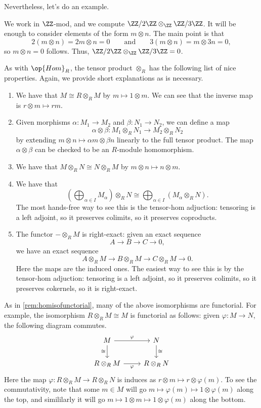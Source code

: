 Nevertheless, let's do an example.
\begin{example}
	We work in $\ZZ$-mod, and we compute $\ZZ/2\ZZ\otimes_\ZZ\ZZ/3\ZZ$. It will be enough to consider elements of the form $m\otimes n$. The main point is that
	\[2(m\otimes n)=2m\otimes n=0\qquad\text{and}\qquad3(m\otimes n)=m\otimes3n=0,\]
	so $m\otimes n=0$ follows. Thus, $\ZZ/2\ZZ\otimes_\ZZ\ZZ/3\ZZ=0$.
\end{example}
As with $\op{Hom}_R$, the tensor product $\otimes_R$ has the following list of nice properties. Again, we provide short explanations as is necessary.
\begin{enumerate}
	\item We have that $M\cong R\otimes_RM$ by $m\mapsto1\otimes m$. We can see that the inverse map is $r\otimes m\mapsto rm$.
	\item Given morphisms $\alpha:M_1\to M_2$ and $\beta:N_1\to N_2$, we can define a map
	\[\alpha\otimes\beta:M_1\otimes_R N_1\to M_2\otimes_R N_2\]
	by extending $m\otimes n\mapsto\alpha m\otimes\beta n$ linearly to the full tensor product. The map $\alpha\otimes\beta$ can be checked to be an $R$-module homomorphism.
	\item We have that $M\otimes_R N\cong N\otimes_R M$ by $m\otimes n\mapsto n\otimes m$.
	\item We have that
	\[\left(\bigoplus_{\alpha\in I}M_\alpha\right)\otimes_RN\cong\bigoplus_{\alpha\in I}(M_\alpha\otimes_R N).\]
	The most hands-free way to see this is the tensor-hom adjuction: tensoring is a left adjoint, so it preserves colimits, so it preserves coproducts.
	\item The functor $-\otimes_RM$ is right-exact: given an exact sequence
	\[A\to B\to C\to 0,\]
	we have an exact sequence
	\[A\otimes_RM\to B\otimes_RM\to C\otimes_RM\to 0.\]
	Here the maps are the induced ones. The easiest way to see this is by the tensor-hom adjuction: tensoring is a left adjoint, so it preserves colimits, so it preserves cokernels, so it is right-exact.
\end{enumerate}
\begin{remark}[Nir] \label{rem:tensorisofunctorial}
	As in \autoref{rem:homisofunctorial}, many of the above isomorphisms are functorial. For example, the isomorphism $R\otimes_RM\cong M$ is functorial as follows: given $\varphi:M\to N$, the following diagram commutes.
	\[\begin{tikzcd}
		M & N \\
		{R\otimes_RM} & {R\otimes_RN}
		\arrow["\cong"', from=1-1, to=2-1]
		\arrow["\cong", from=1-2, to=2-2]
		\arrow["\varphi", from=1-1, to=1-2]
		\arrow["\varphi"', from=2-1, to=2-2]
	\end{tikzcd}\]
	Here the map $\varphi:R\otimes_RM\to R\otimes_RN$ is induces as $r\otimes m\mapsto r\otimes\varphi(m)$. To see the commutativity, note that some $m\in M$ will go $m\mapsto\varphi(m)\mapsto1\otimes\varphi(m)$ along the top, and simililarly it will go $m\mapsto1\otimes m\mapsto1\otimes\varphi(m)$ along the bottom.
\end{remark}
